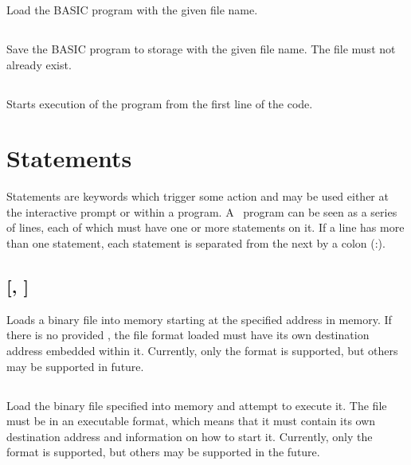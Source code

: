 \documentclass{report}
\begin{document}
    Load the BASIC program with the given file name.

    \subsection*{ }

    Save the BASIC program to storage with the given file name.
    The file must not already exist.
    
    \subsection*{}

    Starts execution of the program from the first line of the code.

    \section*{Statements}

    Statements are keywords which trigger some action and may be used either at the interactive prompt or within a program.
    A \BASIC\ program can be seen as a series of lines, each of which must have one or more statements on it.
    If a line has more than one statement, each statement is separated from the next by a colon (:).

    \subsection*{  [, ]}

    Loads a binary file into memory starting at the specified  address in memory. If there is no
    provided , the file format loaded must have its own destination address embedded within it.
    Currently, only the  format is supported, but others may be supported in future.

    \subsection*{ }

    Load the binary file specified into memory and attempt to execute it.
    The file must be in an executable format, which means that it must contain its own destination address
    and information on how to start it. Currently, only the  format is supported, but others
    may be supported in the future.
\end{document}
